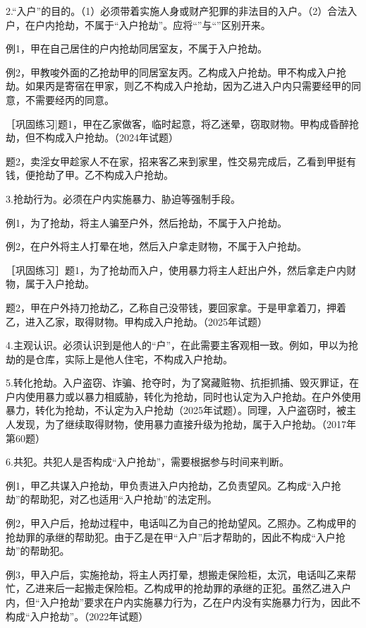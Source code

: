 2.“入户”的目的。（1）必须带着实施人身或财产犯罪的非法目的入户。（2）合法入户，在户内抢劫，不属于“入户抢劫”。应将“”与“”区别开来。

例1，甲在自己居住的户内抢劫同居室友，不属于入户抢劫。

例2，甲教唆外面的乙抢劫甲的同居室友丙。乙构成入户抢劫。甲不构成入户抢劫。如果丙是寄宿在甲家，则乙不构成入户抢劫，因为乙进入户内只需要经甲的同意，不需要经丙的同意。

［巩固练习]题1，甲在乙家做客，临时起意，将乙迷晕，窃取财物。甲构成昏醉抢劫，但不构成入户抢劫。（2024年试题）

题2，卖淫女甲趁家人不在家，招来客乙来到家里，性交易完成后，乙看到甲挺有钱，便抢劫了甲。乙不构成入户抢劫。

3.抢劫行为。必须在户内实施暴力、胁迫等强制手段。

例1，为了抢劫，将主人骗至户外，然后抢劫，不属于入户抢劫。

例2，在户外将主人打晕在地，然后入户拿走财物，不属于入户抢劫。

［巩固练习］题1，为了抢劫而入户，使用暴力将主人赶出户外，然后拿走户内财物，属于入户抢劫。

题2，甲在户外持刀抢劫乙，乙称自己没带钱，要回家拿。于是甲拿着刀，押着乙，进入乙家，取得财物。甲构成入户抢劫。（2025年试题）

4.主观认识。必须认识到是他人的“户”，在此需要主客观相一致。例如，甲以为抢劫的是仓库，实际上是他人住宅，不构成入户抢劫。

5.转化抢劫。入户盗窃、诈骗、抢夺时，为了窝藏赃物、抗拒抓捕、毁灭罪证，在户内使用暴力或以暴力相威胁，转化为抢劫，同时也认定为入户抢劫。在户外使用暴力，转化为抢劫，不认定为入户抢劫（2025年试题）。同理，入户盗窃时，被主人发现，为了继续取得财物，使用暴力直接升级为抢劫，属于入户抢劫。（2017年第60题）

6.共犯。共犯人是否构成“入户抢劫”，需要根据参与时间来判断。

例1，甲乙共谋入户抢劫，甲负责进入户内抢劫，乙负责望风。乙构成“入户抢劫”的帮助犯，对乙也适用“入户抢劫”的法定刑。

例2，甲入户后，抢劫过程中，电话叫乙为自己的抢劫望风。乙照办。乙构成甲的抢劫罪的承继的帮助犯。由于乙是在甲“入户”后才帮助的，因此不构成“入户抢劫”的帮助犯。

例3，甲入户后，实施抢劫，将主人丙打晕，想搬走保险柜，太沉，电话叫乙来帮忙，乙进来后一起搬走保险柜。乙构成甲的抢劫罪的承继的正犯。虽然乙进入户内，但“入户抢劫”要求在户内实施暴力行为，乙在户内没有实施暴力行为，因此不构成“入户抢劫”。（2022年试题）

